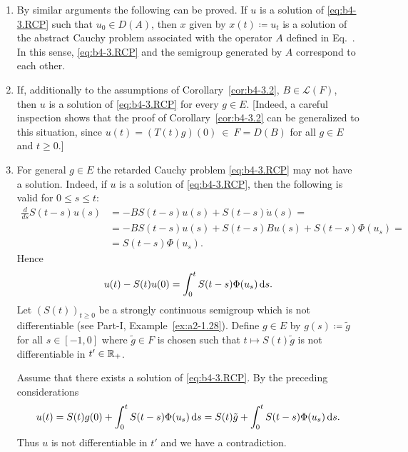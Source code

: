 \begin{remarks*} 
\begin{enumerate}[\upshape (i), wide, labelindent=.25em]

\item 
By similar arguments the following can be proved. 
If\/ $u$ is a solution of \eqref{eq:b4-3.RCP} such that $u_{0} \in D(A)$, then $x$ given by $x(t) \coloneq  u_t$ is a solution of the abstract Cauchy problem associated with the operator $A$ defined in Eq.~. 
In this sense, \eqref{eq:b4-3.RCP} and the semigroup generated by $A$ correspond to each other.

\item 
If, additionally to the assumptions of Corollary~\ref{cor:b4-3.2}, $B \in \mathcal{L}(F)$, then $u$ is a solution of \eqref{eq:b4-3.RCP} for every $g \in E$. 
[Indeed, a careful inspection shows that the proof of Corollary~\ref{cor:b4-3.2} can be generalized to this situation, since $u(t) = (T(t)g)(0)~\in~F = D(B)$ for all $g \in E$ and $t \geq 0$.]

\item 
For general $g \in E$ the retarded Cauchy problem \eqref{eq:b4-3.RCP} may not have a solution. 
Indeed, if\/ $u$ is a solution of \eqref{eq:b4-3.RCP}, then the following is valid for $0 \leq s \leq t$:
\begin{equation*}
	\begin{aligned}
\frac{d}{ds}S(t-s)u(s) &= -BS(t-s)u(s) + S(t-s)\dot{u}(s) =\\
& = -BS(t-s)u(s) + S(t-s)Bu(s) + S(t-s)\Phi(u_s) = \\ & =S(t-s)\Phi(u_s) .
\end{aligned}
\end{equation*} 
Hence
\[
u(t) - S(t)u(0) = \int_0^t S(t-s)\Phi(u_s)  \mathop{}\!\mathrm{d}{s} .
\]
Let $(S(t))_{t \geq 0}$ be a strongly continuous semigroup which is not differentiable (see  Part-I, Example~\ref{ex:a2-1.28}). 
Define $g \in E$ by $g(s)  \coloneq  \tilde{g}$ for all $s \in [-1,0]$ where $\tilde{g} \in F$ is chosen such that
$t \mapsto S(t)\tilde{g}$ is not differentiable in $t' \in \mathbb{R}_+$.

Assume that there exists a solution of \eqref{eq:b4-3.RCP}. 
By the preceding considerations
\[
u(t) = S(t)g(0) + \int_0^t S(t-s)\Phi(u_s)  \mathop{}\!\mathrm{d}{s}  = S(t)\tilde{g} + \int_0^t S(t-s)\Phi(u_s)  \mathop{}\!\mathrm{d}{s}  .
\]
Thus $u$ is not differentiable in $t'$ and we have a contradiction.
\end{enumerate}
\end{remarks*}
